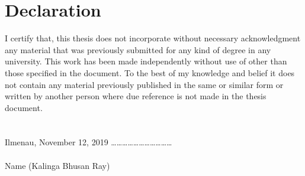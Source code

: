 


\pagestyle{empty}

\section*{Declaration}
I certify that, this thesis does not incorporate without necessary acknowledgment any material that was previously submitted for any kind of degree in any university. This work has been made independently without use of other than those specified in the document. To the best of my knowledge and belief it does not contain any material previously published in the same or similar form or written by another person where due reference is not made in the thesis document.\\ \\ \\
Ilmenau, November 12, 2019 \hspace{10pt} \ldots \ldots \ldots \ldots \ldots \ldots \ldots \ldots \ldots \ldots \ldots \\ \\ 
Name \hspace{130pt} (Kalinga Bhusan Ray)

\newpage

\begin{abstractpage}

\end{abstractpage}

% 

